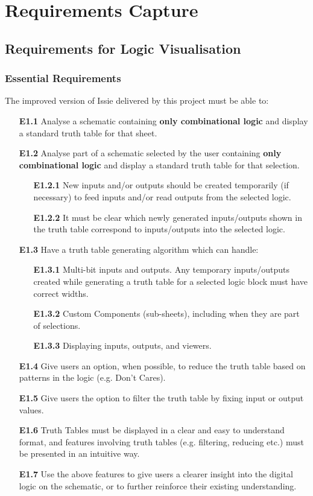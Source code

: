 \chapter{Requirements Capture} \label{chap:requirements}
\section{Requirements for Logic Visualisation}
\subsection*{Essential Requirements}
The improved version of Issie delivered by this project must be able to:
\begin{itemize}
    \item[\textbf{E1.1}] Analyse a schematic containing \textbf{only combinational logic} and display a standard truth table for that sheet.
    \medskip
    \item[\textbf{E1.2}] Analyse part of a schematic selected by the user containing \textbf{only combinational logic} and display a standard truth table for that selection.
    \begin{itemize}
        \item[\textbf{E1.2.1}] New inputs and/or outputs should be created temporarily (if necessary) to feed inputs and/or read outputs from the selected logic.
        \item[\textbf{E1.2.2}] It must be clear which newly generated inputs/outputs shown in the truth table correspond to inputs/outputs into the selected logic.
    \end{itemize}
    \medskip
    \item[\textbf{E1.3}] Have a truth table generating algorithm which can handle:
    \begin{itemize}
        \item[\textbf{E1.3.1}] Multi-bit inputs and outputs. Any temporary inputs/outputs created while generating a truth table for a selected logic block must have correct widths.
        \item[\textbf{E1.3.2}] Custom Components (sub-sheets), including when they are part of selections.
        \item[\textbf{E1.3.3}] Displaying inputs, outputs, and viewers.
    \end{itemize}
    \medskip
    \item[\textbf{E1.4}] Give users an option, when possible, to reduce the truth table based on patterns in the logic (e.g. Don't Cares).
    \medskip
    \item[\textbf{E1.5}] Give users the option to filter the truth table by fixing input or output values.
    \medskip
    \item[\textbf{\textbf{E1.6}}] Truth Tables must be displayed in a clear and easy to understand format, and features involving truth tables (e.g. filtering, reducing etc.) must be presented in an intuitive way.
    \item[\textbf{E1.7}] Use the above features to give users a clearer insight into the digital logic on the schematic, or to further reinforce their existing understanding.
\end{itemize}

